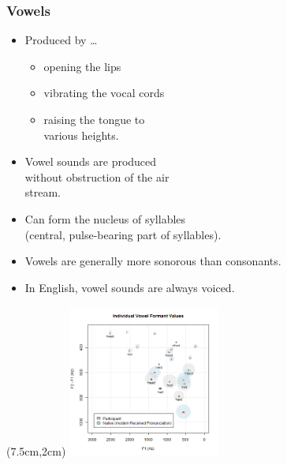 \documentclass[12pt, table]{beamer}
\begin{document}
\begin{frame}
\frametitle{Vowels}
\begin{itemize}
\item Produced by \dots
\begin{itemize}
\item opening the lips 
\item vibrating the vocal cords 
\item raising the tongue to\\
various heights. 
\end{itemize}
\item Vowel sounds are produced\\
without obstruction of the air\\
stream.
\item Can form the nucleus of syllables\\
(central, pulse-bearing part of syllables).
\item Vowels are generally more sonorous than consonants.
\item In English, vowel sounds are always voiced.
\end{itemize}
\begin{textblock*}{3cm}(7.5cm,2cm)
\includegraphics[width=5cm]{images/vowelchart.png}
\end{textblock*}
\end{frame}
\end{document}
